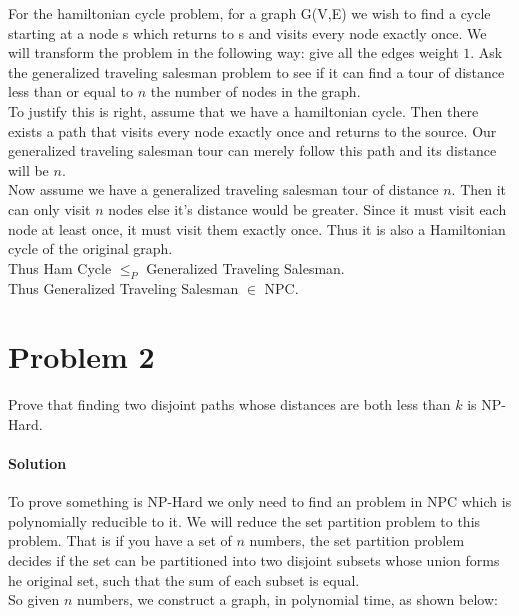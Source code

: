\documentclass[12pt]{article}
\begin{document}
For the hamiltonian cycle problem, for a graph G(V,E) we wish to find a cycle starting at a node s which returns to s and visits every node exactly once.  We will transform the problem in the following way: give all the edges weight $1$.  Ask the generalized traveling salesman problem to see if it can find a tour of distance less than or equal to $n$ the number of nodes in the graph.\\
To justify this is right, assume that we have a hamiltonian cycle.  Then there exists a path that visits every node exactly once and returns to the source.  Our generalized traveling salesman tour can merely follow this path and its distance will be $n$.\\
Now assume we have a generalized traveling salesman tour of distance $n$.  Then it can only visit $n$ nodes else it's distance would be greater.  Since it must visit each node at least once, it must visit them exactly once.  Thus it is also a Hamiltonian cycle of the original graph.\\
Thus Ham Cycle $ \leq_P$ Generalized Traveling Salesman.\\
Thus Generalized Traveling Salesman $\in$ NPC.


\section{Problem 2}
Prove that finding two disjoint paths whose distances are both less than $k$ is NP-Hard.

\paragraph{Solution}

To prove something is NP-Hard we only need to find an problem in NPC which is polynomially reducible to it.  We will reduce the set partition problem to this problem.  That is if you have a set of $n$ numbers, the set partition problem decides if the set can be partitioned into two disjoint subsets whose union forms he original set, such that the sum of each subset is equal.\\

So given $n$ numbers, we construct a graph, in polynomial time, as shown below:
\end{document}
